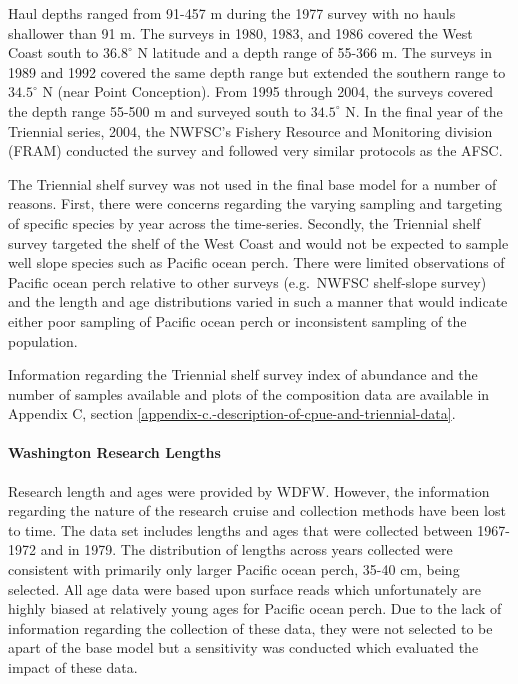 \documentclass[12pt,]{article}
\let\oldparagraph\paragraph
\renewcommand{\paragraph}[1]{\oldparagraph{#1}\mbox{}}
\begin{document}
Haul depths ranged from 91-457 m during the 1977 survey with no hauls
shallower than 91 m. The surveys in 1980, 1983, and 1986 covered the
West Coast south to \(36.8^\circ\) N latitude and a depth range of
55-366 m. The surveys in 1989 and 1992 covered the same depth range but
extended the southern range to \(34.5^\circ\) N (near Point Conception).
From 1995 through 2004, the surveys covered the depth range 55-500 m and
surveyed south to \(34.5^\circ\) N. In the final year of the Triennial
series, 2004, the NWFSC's Fishery Resource and Monitoring division
(FRAM) conducted the survey and followed very similar protocols as the
AFSC.

The Triennial shelf survey was not used in the final base model for a
number of reasons. First, there were concerns regarding the varying
sampling and targeting of specific species by year across the
time-series. Secondly, the Triennial shelf survey targeted the shelf of
the West Coast and would not be expected to sample well slope species
such as Pacific ocean perch. There were limited observations of Pacific
ocean perch relative to other surveys (e.g.~NWFSC shelf-slope survey)
and the length and age distributions varied in such a manner that would
indicate either poor sampling of Pacific ocean perch or inconsistent
sampling of the population.

Information regarding the Triennial shelf survey index of abundance and
the number of samples available and plots of the composition data are
available in Appendix C, section
\ref{appendix-c.-description-of-cpue-and-triennial-data}.

\paragraph{Washington Research
Lengths}\label{washington-research-lengths}

Research length and ages were provided by WDFW. However, the information
regarding the nature of the research cruise and collection methods have
been lost to time. The data set includes lengths and ages that were
collected between 1967-1972 and in 1979. The distribution of lengths
across years collected were consistent with primarily only larger
Pacific ocean perch, 35-40 cm, being selected. All age data were based
upon surface reads which unfortunately are highly biased at relatively
young ages for Pacific ocean perch. Due to the lack of information
regarding the collection of these data, they were not selected to be
apart of the base model but a sensitivity was conducted which evaluated
the impact of these data.
\end{document}
